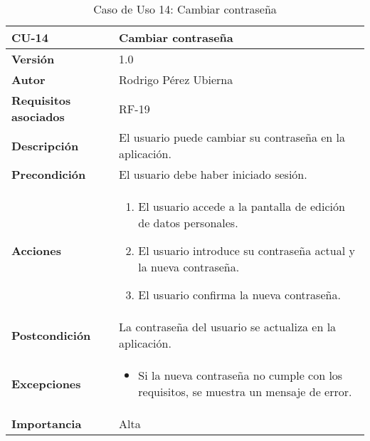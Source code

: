 \begin{table}[p]
	\centering
	\begin{tabularx}{\linewidth}{ p{} p{} }
		\toprule
		\textbf{CU-14} & \textbf{Cambiar contraseña}\\
		\toprule
		\textbf{Versión} & 1.0 \\
		\textbf{Autor} & Rodrigo Pérez Ubierna \\
		\textbf{Requisitos asociados} & RF-19 \\
		\textbf{Descripción} & El usuario puede cambiar su contraseña en la aplicación. \\
		\textbf{Precondición} & El usuario debe haber iniciado sesión. \\
		\textbf{Acciones} &
		\begin{enumerate}
			\def\labelenumi{\arabic{enumi}.}
			\tightlist
			\item El usuario accede a la pantalla de edición de datos personales.
			\item El usuario introduce su contraseña actual y la nueva contraseña.
			\item El usuario confirma la nueva contraseña.
		\end{enumerate}\\
		\textbf{Postcondición} & La contraseña del usuario se actualiza en la aplicación. \\
		\textbf{Excepciones} &
			\begin{itemize}
				\item Si la nueva contraseña no cumple con los requisitos, se muestra un mensaje de error.
			\end{itemize} \\
		\textbf{Importancia} & Alta \\
		\bottomrule
	\end{tabularx}
	\caption{Caso de Uso 14: Cambiar contraseña}
\end{table}


